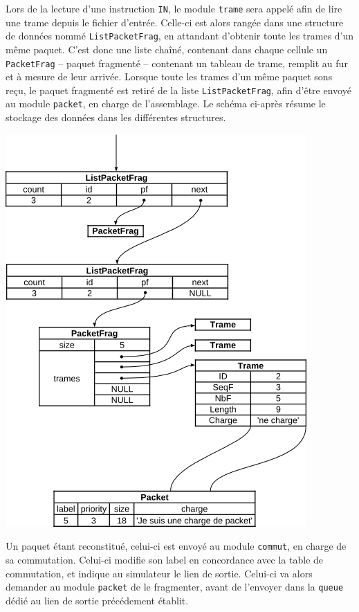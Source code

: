 \documentclass[a4paper,11pt]{article}
\begin{document}
Lors de la lecture d'une instruction \texttt{IN}, le module \texttt{trame} sera appelé afin de lire une trame depuis le fichier d'entrée. Celle-ci est alors rangée dans une structure de données nommé \texttt{ListPacketFrag}, en attandant d'obtenir toute les trames d'un même paquet. C'est donc une liste chaîné, contenant dans chaque cellule un \texttt{PacketFrag} – paquet fragmenté – contenant un tableau de trame, remplit au fur et à mesure de leur arrivée. Lorsque toute les trames d'un même paquet sons reçu, le paquet fragmenté est retiré de la liste \texttt{ListPacketFrag}, afin d'être envoyé au module \texttt{packet}, en charge de l'assemblage. Le schéma ci-après résume le stockage des données dans les différentes structures.

\includegraphics{s1.png}

Un paquet étant reconstitué, celui-ci est envoyé au module \texttt{commut}, en charge de sa commutation. Celui-ci modifie son label en concordance avec la table de commutation, et indique au simulateur le lien de sortie. Celui-ci va alors demander au module \texttt{packet} de le fragmenter, avant de l'envoyer dans la \texttt{queue} dédié au lien de sortie précédement établit.
\end{document}
